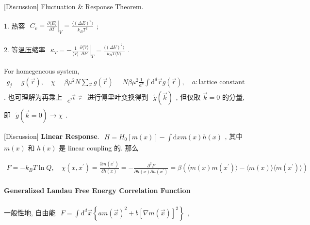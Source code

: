 \documentclass[../../main.tex]{subfiles}
\begin{document}
[Discussion] Fluctuation \& Response Theorem. 

1. 热容 $\begin{aligned}
    C_{v} = \left. \frac{\partial \langle E \rangle}{\partial T} \right|_V = \frac{\langle (\Delta E)^2 \rangle}{k_B T^2} 
\end{aligned}$;

2. 等温压缩率 $\begin{aligned}
    \kappa_T = - \frac{1}{\langle V \rangle} \left. \frac{\partial \langle V \rangle}{\partial P} \right|_T = \frac{\langle (\Delta V)^2 \rangle}{k_B T \langle V \rangle} 
\end{aligned}$. 

For homegeneous system, $\begin{aligned}
    g_{j}=g(\vec{r}),\quad \chi = \beta\mu^{2}N\sum_{\vec{r}}g\left(\vec{r}\right) = N\beta\mu^{2}\frac{1}{a^{d}}\int\mathrm{d}^{d}\vec{r}g\left(\vec{r}\right),\quad a:\text{lattice constant}
\end{aligned}$. 也可理解为再乘上 $\begin{aligned}
    e^{i\vec{k}\cdot\vec{r}}
\end{aligned}$ 进行傅里叶变换得到 $\begin{aligned}
    \widetilde{g}\left(\vec{k}\right)
\end{aligned}$, 但仅取 $\vec{k}=0$ 的分量, 即 $\begin{aligned}
    \widetilde{g}\left(\vec{k}=0\right)\rightarrow \chi
\end{aligned}$. 

[Discussion] \textbf{Linear Response}. $\begin{aligned}
    H = H_{0}[m(x)] - \int\mathrm{d}x m(x)h(x)
\end{aligned}$, 其中 $m(x)$ 和 $h(x)$ 是 linear coupling 的. 那么

$\begin{aligned}
    F = -k_{B}T\ln{Q},\quad \chi(x,x^{\prime}) = \frac{\partial m(x^{\prime})}{\delta h(x)} = -\frac{\partial^{2}F}{\partial h(x)\partial h(x^{\prime})} = \beta\left(
        \langle m(x)m(x^{\prime})\rangle - \langle m(x)\rangle\langle m(x^{\prime})\rangle
    \right)
\end{aligned}$

\paragraph{Generalized Landau Free Energy Correlation Function}  

一般性地, 自由能 $\begin{aligned}
    F = \int\mathrm{d}^{d}\vec{x} \left\{am\left(\vec{x}\right)^{2} + b\left[\nabla m\left(\vec{x}\right)\right]^{2}\right\}
\end{aligned}$, 
\end{document}
